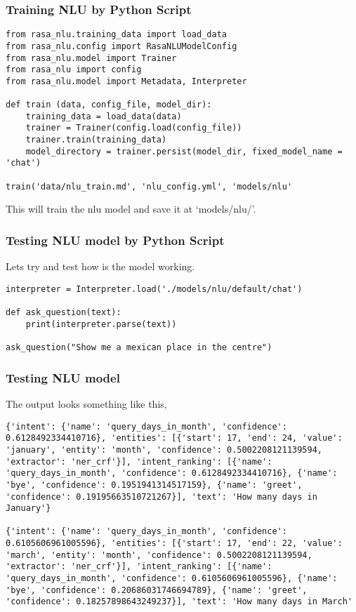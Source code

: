  \begin{frame}[fragile]\frametitle{Training NLU by Python Script}
 
\begin{lstlisting}
from rasa_nlu.training_data import load_data
from rasa_nlu.config import RasaNLUModelConfig
from rasa_nlu.model import Trainer
from rasa_nlu import config
from rasa_nlu.model import Metadata, Interpreter

def train (data, config_file, model_dir):
    training_data = load_data(data)
    trainer = Trainer(config.load(config_file))
    trainer.train(training_data)
    model_directory = trainer.persist(model_dir, fixed_model_name = 'chat')

train('data/nlu_train.md', 'nlu_config.yml', 'models/nlu'
\end{lstlisting}
This will train the nlu model and save it at `models/nlu/'.
\end{frame}

 \begin{frame}[fragile]\frametitle{Testing NLU model by Python Script}
 
Lets try and test how is the model working.

\begin{lstlisting}
interpreter = Interpreter.load('./models/nlu/default/chat')

def ask_question(text):
    print(interpreter.parse(text))

ask_question("Show me a mexican place in the centre")
\end{lstlisting}

\end{frame}

 \begin{frame}[fragile]\frametitle{Testing NLU model}
The output looks something like this,


\begin{lstlisting}
{'intent': {'name': 'query_days_in_month', 'confidence': 0.6128492334410716}, 'entities': [{'start': 17, 'end': 24, 'value': 'january', 'entity': 'month', 'confidence': 0.5002208121139594, 'extractor': 'ner_crf'}], 'intent_ranking': [{'name': 'query_days_in_month', 'confidence': 0.6128492334410716}, {'name': 'bye', 'confidence': 0.1951941314517159}, {'name': 'greet', 'confidence': 0.19195663510721267}], 'text': 'How many days in January'}

{'intent': {'name': 'query_days_in_month', 'confidence': 0.6105606961005596}, 'entities': [{'start': 17, 'end': 22, 'value': 'march', 'entity': 'month', 'confidence': 0.5002208121139594, 'extractor': 'ner_crf'}], 'intent_ranking': [{'name': 'query_days_in_month', 'confidence': 0.6105606961005596}, {'name': 'bye', 'confidence': 0.20686031746694789}, {'name': 'greet', 'confidence': 0.18257898643249237}], 'text': 'How many days in March'
\end{lstlisting}

\end{frame}

